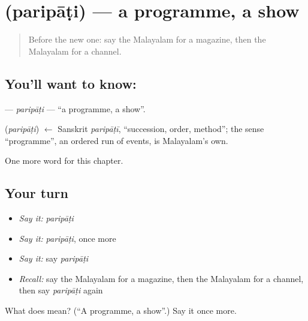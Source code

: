 \section[\texorpdfstring{\ml{പരിപാടി} (paripāṭi)}{പരിപാടി (paripāṭi)}]{ (paripāṭi) — a programme, a show}

\label{lesson:ML-C293-paripati}



\begin{quote}
Before the new one: say the Malayalam for a magazine, then the Malayalam for a channel.
\end{quote}

\subsection*{You'll want to know: }
\textbf{} — \emph{paripāṭi} — \textquotedblleft{}a programme, a show\textquotedblright{}.

\begin{cousinweb}
\textbf{} (\emph{paripāṭi}) $\leftarrow$ Sanskrit \emph{paripāṭī}, \textquotedblleft{}succession, order, method\textquotedblright{}; the sense \textquotedblleft{}programme\textquotedblright{}, an ordered run of events, is Malayalam's own.
\end{cousinweb}

\begin{grammarlens}[title={What you've built}]
One more word for this chapter.
\end{grammarlens}

\subsection*{Your turn}
\begin{itemize}
\raggedright
  \item \emph{Say it:} \emph{paripāṭi}
  \item \emph{Say it:} \emph{paripāṭi}, once more
  \item \emph{Say it:} say \emph{paripāṭi}
  \item \emph{Recall:} say the Malayalam for a magazine, then the Malayalam for a channel, then say \emph{paripāṭi} again
\end{itemize}

\begin{tcolorbox}[breakable,colback=teal!4,colframe=teal!35!black,title={Before you move on}]
What does  mean? (\textquotedblleft{}A programme, a show\textquotedblright{}.) Say it once more.
\end{tcolorbox}
